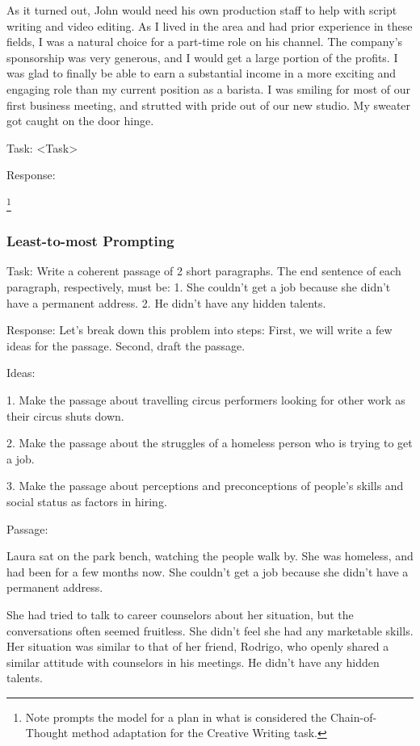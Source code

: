 \documentclass[11pt]{article}
\begin{document}
As it turned out, John would need his own production staff to help with script writing and video editing. As I lived in the area and had prior experience in these fields, I was a natural choice for a part-time role on his channel. The company's sponsorship was very generous, and I would get a large portion of the profits. I was glad to finally be able to earn a substantial income in a more exciting and engaging role than my current position as a barista. I was smiling for most of our first business meeting, and strutted with pride out of our new studio. My sweater got caught on the door hinge.

Task: <Task>

Response:

\footnote{Note \citealp{yao_tree_2023} prompts the model for a plan in what is considered the Chain-of-Thought method adaptation for the Creative Writing task.}

\subsubsection*{Least-to-most Prompting}

Task: Write a coherent passage of 2 short paragraphs. The end sentence of each paragraph, respectively, must be: 1. She couldn't get a job because she didn't have a permanent address. 2. He didn't have any hidden talents.

Response: Let's break down this problem into steps: First, we will write a few ideas for the passage. Second, draft the passage.

Ideas:

1. Make the passage about travelling circus performers looking for other work as their circus shuts down.

2. Make the passage about the struggles of a homeless person who is trying to get a job. 

3. Make the passage about perceptions and preconceptions of people's skills and social status as factors in hiring.

Passage: 

Laura sat on the park bench, watching the people walk by. She was homeless, and had been for a few months now. She couldn't get a job because she didn't have a permanent address.

She had tried to talk to career counselors about her situation, but the conversations often seemed fruitless. She didn't feel she had any marketable skills. Her situation was similar to that of her friend, Rodrigo, who openly shared a similar attitude with counselors in his meetings. He didn't have any hidden talents.
\end{document}
